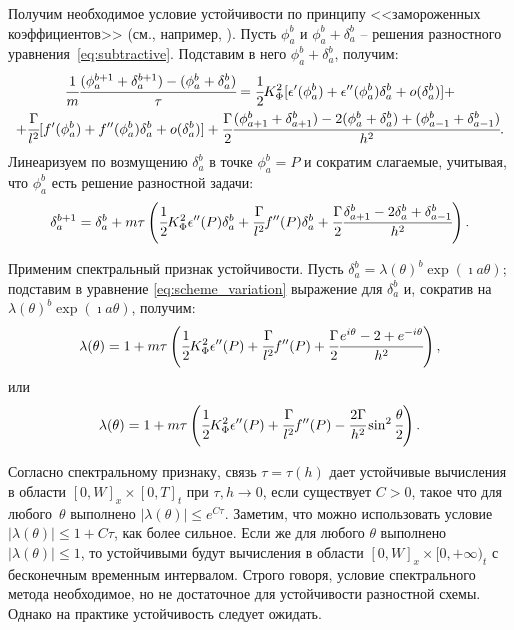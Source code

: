 Получим необходимое условие устойчивости по принципу <<замороженных коэффициентов>> (см., например, \cite{bahvalov_computational_methods}). Пусть $\phi_a^b$ и $\phi_a^b + \delta_a^b$ -- решения разностного уравнения~\eqref{eq:subtractive}. Подставим в него $\phi_a^b + \delta_a^b$, получим:
\begin{multline*}
    \cfrac{1}{m} \cfrac{(\phi_a^{b + 1} + \delta_a^{b + 1}) - (\phi_a^b + \delta_a^b)}{\tau} = \cfrac{1}{2} K_\Phi^2 [\epsilon'(\phi_a^b) + \epsilon''(\phi_a^b) \delta_a^b + o(\delta_a^b)] + \\ + \cfrac{\Gamma}{l^2} [f'(\phi_a^b) + f''(\phi_a^b) \delta_a^b + o(\delta_a^b)] + \cfrac{\Gamma}{2} \cfrac{(\phi_{a + 1}^b + \delta_{a + 1}^b) - 2 (\phi_a^b + \delta_a^b) + (\phi_{a - 1}^b + \delta_{a - 1}^b)}{h^2} {\text{.}}
\end{multline*}
Линеаризуем по возмущению $\delta_a^b$ в точке $\phi_a^b = P$ и сократим слагаемые, учитывая, что $\phi_a^b$ есть решение разностной задачи:
\begin{equation}
    \delta_a^{b + 1} = \delta_a^b + m \tau \left( \cfrac{1}{2} K_\Phi^2 \epsilon''(P) \delta_a^b + \cfrac{\Gamma}{l^2} f''(P) \delta_a^b + \cfrac{\Gamma}{2} \cfrac{\delta_{a + 1}^b - 2 \delta_a^b + \delta_{a - 1}^b}{h^2} \right) {\text{.}}
    \label{eq:scheme_variation}
\end{equation} 

Применим спектральный признак устойчивости. Пусть $\delta_a^b = \lambda(\theta)^b \exp(\imath a \theta)$; подставим в уравнение \eqref{eq:scheme_variation} выражение для $\delta_a^b$ и, сократив на $\lambda(\theta)^b \exp(\imath a \theta)$, получим:
$$\lambda(\theta) = 1 + m \tau \left( \cfrac{1}{2} K_\Phi^2 \epsilon''(P) + \cfrac{\Gamma}{l^2} f''(P) + \cfrac{\Gamma}{2} \cfrac{e^{i \theta} - 2 + e^{-i \theta}}{h^2} \right) {\text{,}}$$
или
\begin{equation}
    \lambda(\theta) = 1 + m \tau \left( \cfrac{1}{2} K_\Phi^2 \epsilon''(P) + \cfrac{\Gamma}{l^2} f''(P) - \cfrac{2 \Gamma}{h^2} \sin^2 \cfrac{\theta}{2} \right) {\text{.}}
    \label{eq:spectral}
\end{equation}

Согласно спектральному признаку, связь $\tau = \tau(h)$ дает устойчивые вычисления в области $[0, W]_x \times [0, T]_t$ при $\tau, h \to 0$, если существует $C > 0$, такое что для любого~$\theta$ выполнено $|\lambda(\theta)| \leqslant e^{C\tau}$. Заметим, что можно использовать условие $|\lambda(\theta)| \leqslant 1 + C\tau$, как более сильное. Если же для любого $\theta$ выполнено $|\lambda(\theta)| \leqslant 1$, то устойчивыми будут вычисления в области $[0, W]_x \times [0, +\infty)_t$ с бесконечным временным интервалом. Строго говоря, условие спектрального метода необходимое, но не достаточное для устойчивости разностной схемы. Однако на практике устойчивость следует ожидать.

